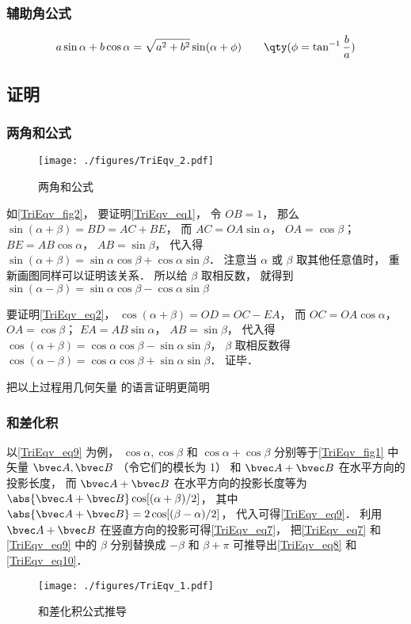 \subsubsection{辅助角公式}
\begin{equation}
a\sin \alpha + b\cos \alpha = \sqrt{a^2+b^2}\sin(\alpha + \phi) \qquad \qty(\phi = \tan^{-1}\frac{b}{a})
\end{equation}

\subsection{证明}
\subsubsection{两角和公式}
\begin{figure}[ht]
\centering
\texttt{[image: ./figures/TriEqv\_2.pdf]}
\caption{两角和公式} \label{TriEqv_fig2}
\end{figure}
如\autoref{TriEqv_fig2}， 要证明\autoref{TriEqv_eq1}， 令 $OB = 1$， 那么 $\sin(\alpha+\beta) = BD = AC + BE$， 而 $AC = OA \sin\alpha$， $OA = \cos\beta$； $BE = AB\cos\alpha$， $AB = \sin\beta$， 代入得 $\sin(\alpha+\beta) = \sin\alpha\cos\beta + \cos\alpha\sin\beta$． 注意当 $\alpha$ 或 $\beta$ 取其他任意值时， 重新画图同样可以证明该关系． 所以给 $\beta$ 取相反数， 就得到 $\sin(\alpha-\beta) = \sin\alpha\cos\beta - \cos\alpha\sin\beta$

要证明\autoref{TriEqv_eq2}， $\cos(\alpha+\beta) = OD = OC - EA$， 而 $OC = OA\cos\alpha$， $OA = \cos\beta$； $EA = AB\sin\alpha$， $AB = \sin\beta$， 代入得 $\cos(\alpha+\beta) = \cos\alpha\cos\beta - \sin\alpha\sin\beta$， $\beta$ 取相反数得 $\cos(\alpha-\beta) = \cos\alpha\cos\beta + \sin\alpha\sin\beta$． 证毕．

把以上过程用几何矢量 的语言证明更简明


\subsubsection{和差化积}
以\autoref{TriEqv_eq9} 为例， $\cos \alpha, \cos \beta$ 和 $\cos \alpha + \cos \beta$ 分别等于\autoref{TriEqv_fig1} 中矢量 $\bvec A, \bvec B$ （令它们的模长为 1） 和 $\bvec A + \bvec B$ 在水平方向的投影长度， 而 $\bvec A + \bvec B$ 在水平方向的投影长度等为 $\abs{\bvec A + \bvec B}\cos[(\alpha+\beta)/2]$， 其中 $\abs{\bvec A + \bvec B} = 2\cos [(\beta-\alpha)/2]$， 代入可得\autoref{TriEqv_eq9}． 利用 $\bvec A + \bvec B$ 在竖直方向的投影可得\autoref{TriEqv_eq7}， 把\autoref{TriEqv_eq7} 和\autoref{TriEqv_eq9} 中的 $\beta$ 分别替换成 $-\beta$ 和 $\beta+\pi$ 可推导出\autoref{TriEqv_eq8} 和\autoref{TriEqv_eq10}．
\begin{figure}[ht]
\centering
\texttt{[image: ./figures/TriEqv\_1.pdf]}
\caption{和差化积公式推导} \label{TriEqv_fig1}
\end{figure}
